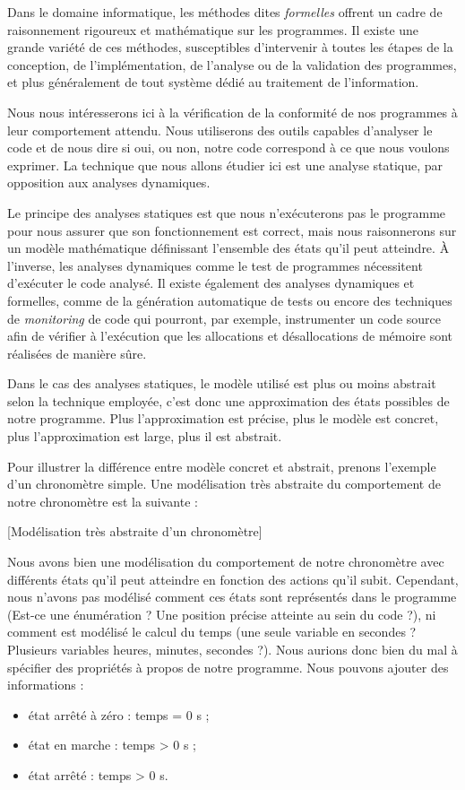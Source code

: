 

Dans le domaine informatique, les méthodes dites \textit{formelles} offrent un
cadre de raisonnement rigoureux et mathématique sur les programmes. Il existe
une grande variété de ces méthodes, susceptibles d'intervenir à toutes les
étapes de la conception, de l'implémentation, de l'analyse ou de la validation
des programmes, et plus généralement de tout système dédié au traitement de
l'information.


Nous nous intéresserons ici à la vérification de la conformité de nos
programmes à leur comportement attendu. Nous utiliserons
des outils capables d'analyser le code et de nous dire si oui, ou non, notre
code correspond à ce que nous voulons exprimer. La technique que nous allons
étudier ici est une analyse statique, par opposition aux analyses dynamiques.



Le principe des analyses statiques est que nous n'exécuterons pas le programme
pour nous assurer que son fonctionnement est correct, mais nous raisonnerons sur
un modèle mathématique définissant l'ensemble des états qu'il peut atteindre.
À l'inverse, les analyses dynamiques comme le test de programmes nécessitent
d'exécuter le code analysé. Il existe également des analyses dynamiques et
formelles, comme de la génération automatique de tests ou encore des techniques
de \textit{monitoring} de code qui pourront, par exemple, instrumenter un code
source afin de vérifier à l'exécution que les allocations et désallocations de
mémoire sont réalisées de manière sûre.



Dans le cas des analyses statiques, le modèle utilisé est plus ou moins
abstrait selon la technique employée, c'est donc une approximation des états
possibles de notre programme. Plus l'approximation est précise, plus le modèle
est concret, plus l'approximation est large, plus il est abstrait.



Pour illustrer la différence entre modèle concret et abstrait, prenons
l'exemple d'un chronomètre simple. Une modélisation très abstraite du
comportement de notre chronomètre est la suivante :


[Modélisation très abstraite d'un chronomètre]


Nous avons bien une modélisation du comportement de notre chronomètre avec
différents états qu'il peut atteindre en fonction des actions qu'il subit.
Cependant, nous n'avons pas modélisé comment ces états sont
représentés dans le programme (Est-ce une énumération ? Une position précise
atteinte au sein du code ?), ni comment est modélisé le calcul du temps (une seule
variable en secondes ? Plusieurs variables heures, minutes, secondes ?). Nous
aurions donc bien du mal à spécifier des propriétés à propos de notre programme.
Nous pouvons ajouter des informations :
\begin{itemize}
\item état arrêté à zéro : temps = 0 s ;
\item état en marche : temps > 0 s ;
\item état arrêté : temps > 0 s.
\end{itemize}


